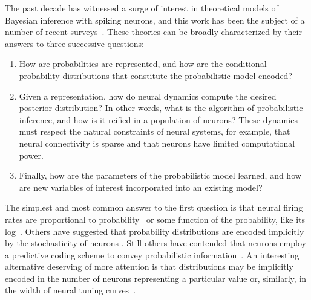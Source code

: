 The past decade has witnessed a surge of interest in theoretical
models of Bayesian inference with spiking neurons, and this work has
been the subject of a number of recent surveys~\citep{Simoncelli2009,
  fiser2010statistically, pouget2013probabilistic, ma2014neural}.
These theories can be broadly characterized by their answers to three
successive questions:
\begin{enumerate}
\item How are probabilities are represented, and how are the conditional
  probability distributions that constitute the probabilistic model
  encoded?
\item Given a representation, how do neural dynamics compute the
  desired posterior distribution? In other words, what is the
  algorithm of probabilistic inference, and how is it reified in a
  population of neurons? These dynamics must respect the natural
  constraints of neural systems, for example, that neural connectivity
  is sparse and that neurons have limited computational power.
\item Finally, how are the parameters of the probabilistic model
  learned, and how are new variables of interest incorporated into
  an existing model?
\end{enumerate}
The simplest and most common answer to the first question is that
neural firing rates are proportional to probability~\citep{Hinton1983,
  Hinton1992, Anderson1994, Barber2003, Buesing2011, Berkes2011,
  nessler2013bayesian, legenstein2014ensembles} or some function of
the probability, like its log~\citep{Rao2004, beck2007exact, Rao2007,
  litvak2009cortical}. Others have suggested that probability
distributions are encoded implicitly by the stochasticity of neurons
\citep{Zemel1998, Sahani2003, Ma2006}. Still others have contended that
neurons employ a predictive coding scheme to convey probabilistic
information~\citep{Rao1999, Deneve2008a, Huang2011}.  An interesting
alternative deserving of more attention is that distributions may be
implicitly encoded in the number of neurons representing a particular
value or, similarly, in the width of neural tuning
curves~\citep{Shi2009, Ganguli2010}. 

